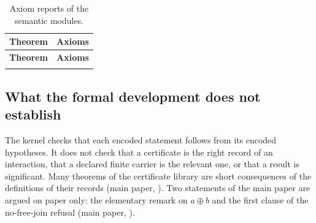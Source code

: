 {\scriptsize
\begin{longtable}{@{}>{\raggedright\arraybackslash}p{8.4cm}>{\raggedright\arraybackslash}p{5.6cm}@{}}
\caption{Axiom reports of the semantic modules.}\label{tab:semantic-axioms}\\
\toprule
\textbf{Theorem} & \textbf{Axioms} \\
\midrule
\endfirsthead
\toprule
\textbf{Theorem} & \textbf{Axioms} \\
\midrule
\endhead
\bottomrule
\endfoot

\end{longtable}
}

\subsection{What the formal development does not establish}

The kernel checks that each encoded statement follows from its encoded hypotheses. It does
not check that a certificate is the right record of an interaction, that a declared finite
carrier is the relevant one, or that a result is significant. Many theorems of the
certificate library are short consequences of the definitions of their records (main
paper, ). Two statements of the main paper are argued on paper
only: the elementary remark on $a\oplus b$ and the first clause of the no-free-join
refusal (main paper, ).
